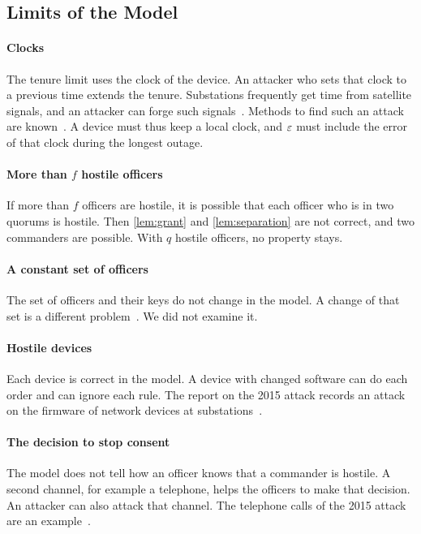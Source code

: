 \subsection{Limits of the Model}
\label{sec:model-limits}

\paragraph{Clocks}
The tenure limit uses the clock of the device. An attacker who sets that clock to a previous time extends the tenure. Substations frequently get time from satellite signals, and an
attacker can forge such signals~\cite{zhang2013tsa,gao2023quick}. Methods to find such an
attack are known~\cite{laverty2022gnss}. A device must thus keep a local clock, and
$\varepsilon$ must include the error of that clock during the longest outage. 

\paragraph{More than $f$ hostile officers}
If more than $f$ officers are hostile, it is possible that each officer who is in two
quorums is hostile. Then \cref{lem:grant} and \cref{lem:separation} are not correct, and two commanders
are possible. With $q$ hostile officers, no property stays.

\paragraph{A constant set of officers}
The set of officers and their keys do not change in the model. A change of that set is a
different problem~\cite{kuznetsov2022reconfig}. We did not examine it.

\paragraph{Hostile devices}
Each device is correct in the model. A device with changed software can do each order and
can ignore each rule. The report on the 2015 attack records an attack on the firmware of
network devices at substations~\cite[p.~9]{eisac2016ukraine}.

\paragraph{The decision to stop consent}
The model does not tell how an officer knows that a commander is hostile. A second
channel, for example a telephone, helps the officers to make that decision. An attacker can
also attack that channel. The telephone calls of the 2015 attack are an
example~\cite[p.~2]{eisac2016ukraine}.

